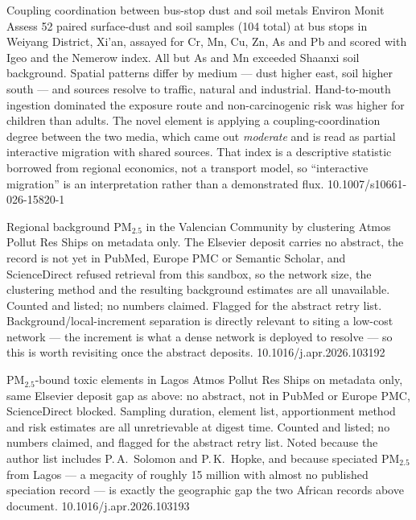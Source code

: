 \documentclass[10pt]{article}
\begin{document}
{Coupling coordination between bus-stop dust and soil metals}
{Environ Monit Assess}
{52 paired surface-dust and soil samples (104 total) at bus stops in Weiyang District,
Xi'an, assayed for Cr, Mn, Cu, Zn, As and Pb and scored with Igeo and the Nemerow index.
All but As and Mn exceeded Shaanxi soil background. Spatial patterns differ by medium ---
dust higher east, soil higher south --- and sources resolve to traffic, natural and
industrial. Hand-to-mouth ingestion dominated the exposure route and non-carcinogenic risk
was higher for children than adults. The novel element is applying a coupling-coordination
degree between the two media, which came out \emph{moderate} and is read as partial
interactive migration with shared sources. That index is a descriptive statistic borrowed
from regional economics, not a transport model, so ``interactive migration'' is an
interpretation rather than a demonstrated flux.}
{10.1007/s10661-026-15820-1}

{Regional background PM$_{2.5}$ in the Valencian Community by clustering}
{Atmos Pollut Res}
{Ships on metadata only. The Elsevier deposit carries no abstract, the record is not yet in
PubMed, Europe PMC or Semantic Scholar, and ScienceDirect refused retrieval from this
sandbox, so the network size, the clustering method and the resulting background estimates
are all unavailable. Counted and listed; no numbers claimed. Flagged for the abstract retry
list. Background/local-increment separation is directly relevant to siting a low-cost
network --- the increment is what a dense network is deployed to resolve --- so this is
worth revisiting once the abstract deposits.}
{10.1016/j.apr.2026.103192}

{PM$_{2.5}$-bound toxic elements in Lagos}
{Atmos Pollut Res}
{Ships on metadata only, same Elsevier deposit gap as above: no abstract, not in
PubMed or Europe PMC, ScienceDirect blocked. Sampling duration, element list, apportionment
method and risk estimates are all unretrievable at digest time. Counted and listed; no
numbers claimed, and flagged for the abstract retry list. Noted because the author list
includes P.\,A.\ Solomon and P.\,K.\ Hopke, and because speciated PM$_{2.5}$ from Lagos ---
a megacity of roughly 15 million with almost no published speciation record --- is exactly
the geographic gap the two African records above document.}
{10.1016/j.apr.2026.103193}

\end{document}
